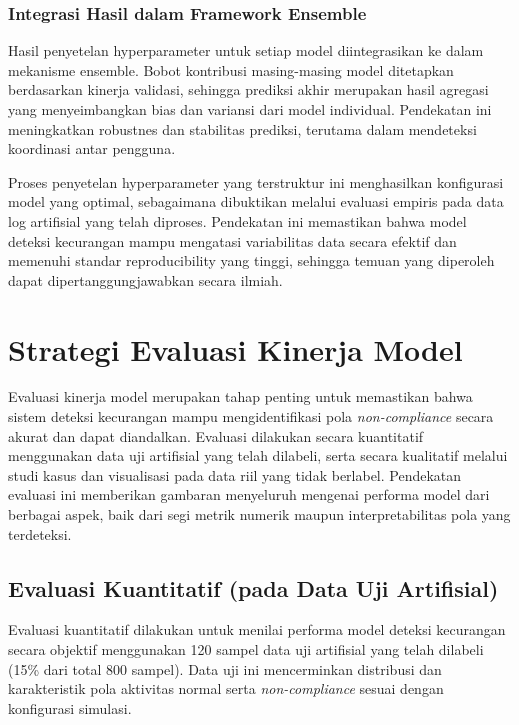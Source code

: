 \subsubsection{Integrasi Hasil dalam Framework Ensemble}
Hasil penyetelan hyperparameter untuk setiap model diintegrasikan ke dalam mekanisme ensemble. Bobot kontribusi masing-masing model ditetapkan berdasarkan kinerja validasi, sehingga prediksi akhir merupakan hasil agregasi yang menyeimbangkan bias dan variansi dari model individual. Pendekatan ini meningkatkan robustnes dan stabilitas prediksi, terutama dalam mendeteksi koordinasi antar pengguna.

Proses penyetelan hyperparameter yang terstruktur ini menghasilkan konfigurasi model yang optimal, sebagaimana dibuktikan melalui evaluasi empiris pada data log artifisial yang telah diproses. Pendekatan ini memastikan bahwa model deteksi kecurangan mampu mengatasi variabilitas data secara efektif dan memenuhi standar reproducibility yang tinggi, sehingga temuan yang diperoleh dapat dipertanggungjawabkan secara ilmiah.

\section{Strategi Evaluasi Kinerja Model}
\label{sec:strategiEvaluasiKinerjaModel}
Evaluasi kinerja model merupakan tahap penting untuk memastikan bahwa sistem deteksi kecurangan mampu mengidentifikasi pola \textit{non-compliance} secara akurat dan dapat diandalkan. Evaluasi dilakukan secara kuantitatif menggunakan data uji artifisial yang telah dilabeli, serta secara kualitatif melalui studi kasus dan visualisasi pada data riil yang tidak berlabel. Pendekatan evaluasi ini memberikan gambaran menyeluruh mengenai performa model dari berbagai aspek, baik dari segi metrik numerik maupun interpretabilitas pola yang terdeteksi.

\subsection{Evaluasi Kuantitatif (pada Data Uji Artifisial)}
\label{sec:evaluasiKuantitatifDataUjiArtifisial}
Evaluasi kuantitatif dilakukan untuk menilai performa model deteksi kecurangan secara objektif menggunakan 120 sampel data uji artifisial yang telah dilabeli (15\% dari total 800 sampel). Data uji ini mencerminkan distribusi dan karakteristik pola aktivitas normal serta \textit{non-compliance} sesuai dengan konfigurasi simulasi. 


